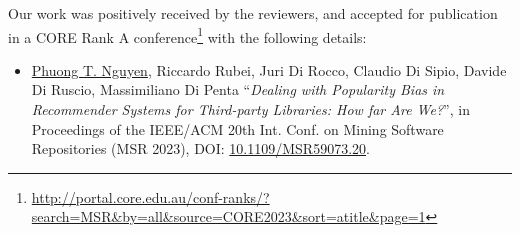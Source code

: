 Our work was positively received by the reviewers, and %
accepted for publication in a CORE Rank A conference\footnote{\url{http://portal.core.edu.au/conf-ranks/?search=MSR&by=all&source=CORE2023&sort=atitle&page=1}} with the following details: %
\vspace{-.1cm}
\begin{itemize}
	\item \small{\underline{Phuong T. Nguyen}, Riccardo Rubei, Juri Di Rocco, Claudio Di Sipio, Davide Di Ruscio, Massimiliano Di Penta ``\emph{Dealing with Popularity Bias in Recommender Systems for Third-party Libraries: How far Are We?}'', in Proceedings of the IEEE/ACM 20th Int. Conf. on Mining Software Repositories (MSR 2023), %
	DOI: \href{https://doi.org/10.1109/MSR59073.2023.00016}{10.1109/MSR59073.20}.}
\end{itemize}
\vspace{-.4cm}







